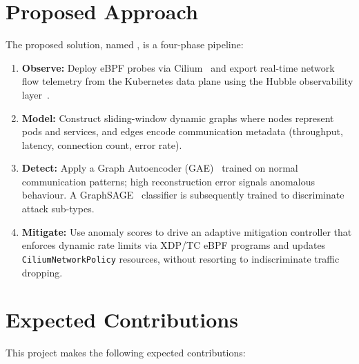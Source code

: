 \section{Proposed Approach}
\label{sec:approach}

The proposed solution, named \sys{}, is a four-phase pipeline:

\begin{enumerate}
  \item \textbf{Observe:} Deploy eBPF probes via Cilium~\cite{cilium} and export
  real-time network flow telemetry from the Kubernetes data plane using the Hubble
  observability layer~\cite{hubble}.

  \item \textbf{Model:} Construct sliding-window dynamic graphs where nodes represent
  pods and services, and edges encode communication metadata (throughput, latency,
  connection count, error rate).

  \item \textbf{Detect:} Apply a Graph Autoencoder (GAE)~\cite{kipf2016vgae} trained on
  normal communication patterns; high reconstruction error signals anomalous behaviour.
  A GraphSAGE~\cite{hamilton2017graphsage} classifier is subsequently trained to
  discriminate attack sub-types.

  \item \textbf{Mitigate:} Use anomaly scores to drive an adaptive mitigation controller
  that enforces dynamic rate limits via XDP/TC eBPF programs and updates
  \texttt{CiliumNetworkPolicy} resources, without resorting to indiscriminate traffic
  dropping.
\end{enumerate}

\section{Expected Contributions}
\label{sec:contributions}

This project makes the following expected contributions:

